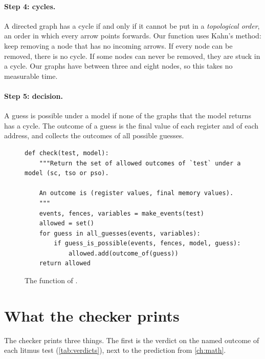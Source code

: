 \paragraph{Step 4: cycles.} A directed graph has a cycle if and only if it cannot be put in a \emph{topological order}, an order in which every arrow points forwards. Our function uses Kahn's method: keep removing a node that has no incoming arrows. If every node can be removed, there is no cycle. If some nodes can never be removed, they are stuck in a cycle. Our graphs have between three and eight nodes, so this takes no measurable time.

\paragraph{Step 5: decision.} A guess is possible under a model if none of the graphs that the model returns has a cycle. The outcome of a guess is the final value of each register and of each address, and  collects the outcomes of all possible guesses.

\begin{figure}[!htbp]
\centering
\begin{lstlisting}[style=vspython]
def check(test, model):
    """Return the set of allowed outcomes of `test` under a model (sc, tso or pso).

    An outcome is (register values, final memory values).
    """
    events, fences, variables = make_events(test)
    allowed = set()
    for guess in all_guesses(events, variables):
        if guess_is_possible(events, fences, model, guess):
            allowed.add(outcome_of(guess))
    return allowed
\end{lstlisting}
\caption{The function  of .}
\label{fig:checkcode}
\end{figure}

\section{What the checker prints}
\label{sec:checkres}

The checker prints three things. The first is the verdict on the named outcome of each litmus test (\cref{tab:verdicts}), next to the prediction from \cref{ch:math}.

